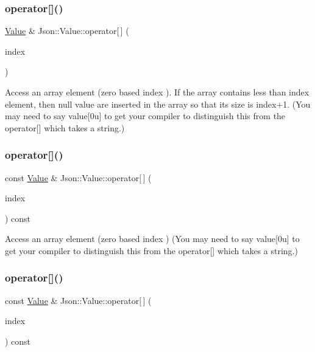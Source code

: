 \subsubsection{\texorpdfstring{operator[]()}{operator[]()}\hspace{0.1cm}{\footnotesize\ttfamily [2/9]}}
{\footnotesize\ttfamily \hyperlink{classJson_1_1Value}{Value} \& Json\+::\+Value\+::operator\mbox{[}$\,$\mbox{]} (\begin{DoxyParamCaption}\item[{int}]{index }\end{DoxyParamCaption})}

Access an array element (zero based index ). If the array contains less than index element, then null value are inserted in the array so that its size is index+1. (You may need to say \textquotesingle{}value\mbox{[}0u\mbox{]}\textquotesingle{} to get your compiler to distinguish this from the operator\mbox{[}\mbox{]} which takes a string.) \mbox{\label{classJson_1_1Value_a46607236038b29695ed80c15895271e4}} 
\subsubsection{\texorpdfstring{operator[]()}{operator[]()}\hspace{0.1cm}{\footnotesize\ttfamily [3/9]}}
{\footnotesize\ttfamily const \hyperlink{classJson_1_1Value}{Value} \& Json\+::\+Value\+::operator\mbox{[}$\,$\mbox{]} (\begin{DoxyParamCaption}\item[{Array\+Index}]{index }\end{DoxyParamCaption}) const}

Access an array element (zero based index ) (You may need to say \textquotesingle{}value\mbox{[}0u\mbox{]}\textquotesingle{} to get your compiler to distinguish this from the operator\mbox{[}\mbox{]} which takes a string.) \mbox{\label{classJson_1_1Value_a0b42557a95621a4676b46a21ffc5e949}} 
\subsubsection{\texorpdfstring{operator[]()}{operator[]()}\hspace{0.1cm}{\footnotesize\ttfamily [4/9]}}
{\footnotesize\ttfamily const \hyperlink{classJson_1_1Value}{Value} \& Json\+::\+Value\+::operator\mbox{[}$\,$\mbox{]} (\begin{DoxyParamCaption}\item[{int}]{index }\end{DoxyParamCaption}) const}

